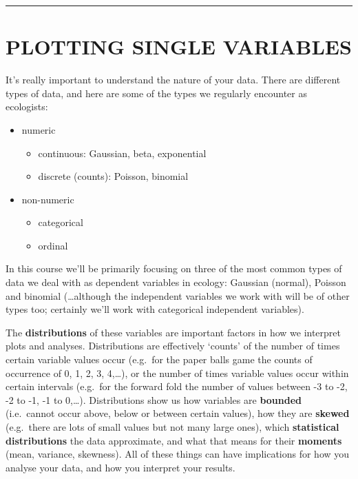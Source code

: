 \documentclass[
]{book}
\providecommand{\tightlist}{%
  \setlength{\itemsep}{0pt}\setlength{\parskip}{0pt}}
\begin{document}
\begin{center}\rule{0.5\linewidth}{\linethickness}\end{center}

\hypertarget{plotting-single-variables}{%
\section{PLOTTING SINGLE VARIABLES}\label{plotting-single-variables}}

It's really important to understand the nature of your data. There are different
types of data, and here are some of the types we regularly encounter as ecologists:

\begin{itemize}
\tightlist
\item
  numeric

  \begin{itemize}
  \tightlist
  \item
    continuous: Gaussian, beta, exponential
  \item
    discrete (counts): Poisson, binomial
  \end{itemize}
\item
  non-numeric

  \begin{itemize}
  \tightlist
  \item
    categorical
  \item
    ordinal\\
  \end{itemize}
\end{itemize}

In this course we'll be primarily focusing on three of the most common types
of data we deal with as dependent variables in ecology: Gaussian (normal),
Poisson and binomial (\ldots although the independent variables we work with
will be of other types too; certainly we'll work with categorical independent variables).

The \textbf{distributions} of these variables are important factors in how we
interpret plots and analyses. Distributions are effectively `counts' of the
number of times certain variable values occur (e.g.~for the paper balls game
the counts of occurrence of 0, 1, 2, 3, 4,\ldots), or the number of times variable
values occur within certain intervals (e.g.~for the forward fold the number of
values between -3 to -2, -2 to -1, -1 to 0,\ldots). Distributions show us how variables are
\textbf{bounded} (i.e.~cannot occur above, below or between certain values),
how they are \textbf{skewed} (e.g.~there are lots of small values but not many large ones),
which \textbf{statistical distributions} the data approximate, and what that means
for their \textbf{moments} (mean, variance, skewness). All of these things can have implications
for how you analyse your data, and how you interpret your results.
\end{document}
